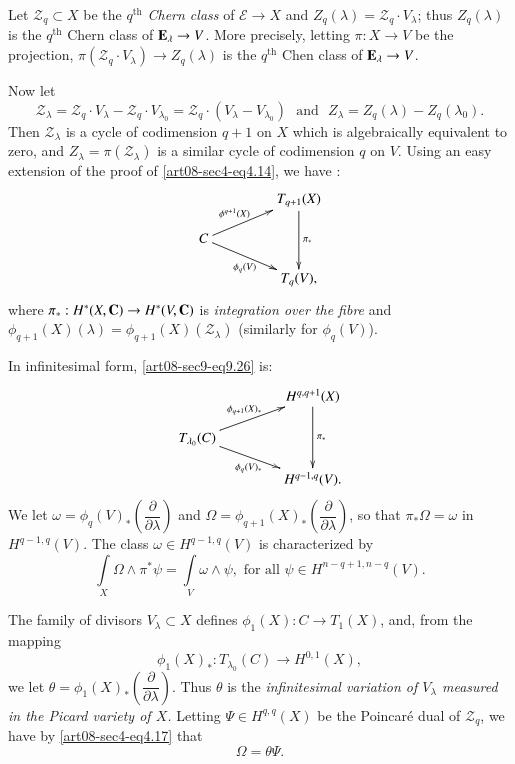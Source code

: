 Let $\mathscr{Z}_{q}\subset X$ be the $q^{\text{th}}$ {\em Chern class} of $\mathcal{E}\to X$ and $Z_{q}(\lambda)=\mathscr{Z}_{q}\cdot V_{\lambda}$; thus $Z_{q}(\lambda)$ is the $q^{\text{th}}$ Chern class of $\mathbf{E}_{\lambda}\to V$. More precisely, letting $\pi:X\to V$ be the projection, $\pi(\mathscr{Z}_{q}\cdot V_{\lambda})\to Z_{q}(\lambda)$ is the $q^{\text{th}}$ Chen class of $\mathbf{E}_{\lambda}\to V$.

Now let
$$
\mathscr{Z}_{\lambda}=\mathscr{Z}_{q}\cdot V_{\lambda}-\mathscr{Z}_{q}\cdot V_{\lambda_{0}}=\mathscr{Z}_{q}\cdot (V_{\lambda}-V_{\lambda_{0}})\text{~ and~ } Z_{\lambda}=Z_{q}(\lambda)-Z_{q}(\lambda_{0}).
$$
Then $\mathscr{Z}_{\lambda}$ is a cycle of codimension $q+1$ on $X$ which is algebraically equivalent to zero, and $Z_{\lambda}=\pi(\mathscr{Z}_{\lambda})$ is a similar cycle of codimension $q$ on $V$. Using an easy extension of the proof of \eqref{art08-sec4-eq4.14}, we have :
\setcounter{equation}{25}
\begin{equation}
\vcenter{\xymatrix@C=1.5cm@R=.5cm{
 & T_{q+1}(X)\ar[dd]^-{\pi_{*}}\\
C\ar[ur]^-{\phi^{q+1}(X)}\ar[dr]_{\phi_{q}(V)} & \\
 & T_{q}(V),
}}\label{art08-sec9-eq9.26}
\end{equation}
where $\pi_{*}:H^{*}(X,\mathbf{C})\to H^{*}(V,\mathbf{C})$ is {\em integration over the fibre} and $\phi_{q+1}(X)(\lambda)=\phi_{q+1}(X)(\mathscr{Z}_{\lambda})$ (similarly for $\phi_{q}(V)$).

In infinitesimal form, \eqref{art08-sec9-eq9.26} is:
\begin{equation}
\vcenter{\xymatrix@C=1.5cm@R=.5cm{
 & H^{q,q+1}(X)\ar[dd]^-{\pi_{*}}\\
T_{\lambda_{0}}(C)\ar[ur]^-{\phi_{q+1}(X)_{*}}\ar[dr]_{\phi_{q}(V)_{*}} & \\
 & H^{q-1,q}(V).
}}\label{art08-sec9-eq9.27}
\end{equation}\pageoriginale
We let $\omega=\phi_{q}(V)_{*}\left(\dfrac{\partial}{\partial\lambda}\right)$ and $\Omega=\phi_{q+1}(X)_{*}\left(\dfrac{\partial}{\partial\lambda}\right)$, so that $\pi_{*}\Omega=\omega$ in $H^{q-1,q}(V)$. The class $\omega\in H^{q-1,q}(V)$ is characterized by
\begin{equation}
\int\limits_{X}\Omega\wedge\pi^{*}\psi=\int\limits_{V}\omega\wedge\psi,\text{ for all } \psi\in H^{n-q+1,n-q}(V).\label{art08-sec9-eq9.28}
\end{equation}

The family of divisors $V_{\lambda}\subset X$ defines $\phi_{1}(X):C\to T_{1}(X)$, and, from the mapping
\begin{equation}
\phi_{1}(X)_{*}:T_{\lambda_{0}}(C)\to H^{0,1}(X),\label{art08-sec9-eq9.29}
\end{equation}
we let $\theta=\phi_{1}(X)_{*}\left(\dfrac{\partial}{\partial\lambda}\right)$. Thus $\theta$ is the {\em infinitesimal variation of $V_{\lambda}$ measured in the Picard variety of $X$.} Letting $\Psi\in H^{q,q}(X)$ be the Poincar\'e dual of $\mathscr{Z}_{q}$, we have by \eqref{art08-sec4-eq4.17} that
\begin{equation}
\Omega=\theta\Psi.\label{art08-sec9-eq9.30}
\end{equation}

